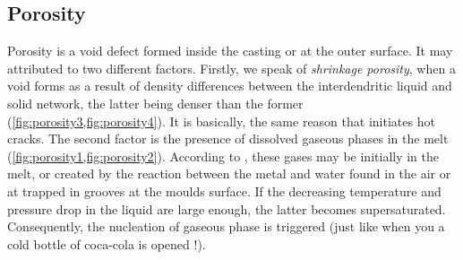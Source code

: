\subsection*{Porosity}
%
Porosity is a void defect formed inside the casting or at the outer surface. It may attributed to two different factors.
Firstly, we speak of \emph{shrinkage porosity}, when a void forms as a result of density 
differences between the interdendritic liquid and solid network, the latter being denser 
than the former (\cref{fig:porosity3,fig:porosity4}). It is basically, the same reason that initiates hot cracks. 
The second factor is the presence of dissolved gaseous phases in the melt (\cref{fig:porosity1,fig:porosity2}). 
According to \citet{dantzig_solidification_2009}, these gases may be initially in the melt, or created by the 
reaction between the metal and water found in the air or at trapped in grooves at the moulds surface. If the 
decreasing temperature and pressure drop in the liquid are large enough, the latter becomes supersaturated. 
Consequently, the nucleation of gaseous phase is triggered (just like when you a cold bottle of coca-cola is opened !).
